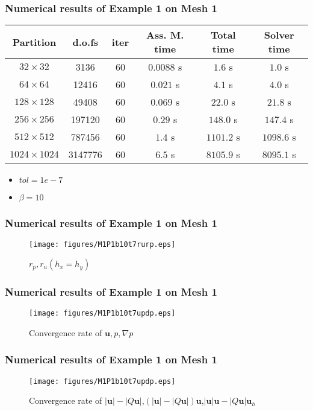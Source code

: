 \documentclass[notheorems,serif]{beamer}
\begin{document}
\begin{frame}
\frametitle{Numerical results of Example 1 on Mesh 1}
\begin{tabular}{ |c|c|c|c|c|c| }   
\hline   
Partition & d.o.fs & iter & Ass. M. time & Total time & Solver time \\
\hline
$32\times 32$ & 3136 & 60 & $0.0088$ s & $1.6$ s & $1.0$ s \\
$64\times 64$ & 12416 & 60 & $0.021$ s & $4.1$ s & $4.0$ s \\
$128\times 128$ & 49408 & 60 & $0.069$ s & $22.0$ s & $21.8$ s \\
$256\times 256$ & 197120 & 60 & $0.29$ s & $148.0$ s & $147.4$ s \\
$512\times 512$ & 787456 & 60 & $1.4$ s & $1101.2$ s & $1098.6$ s \\
$1024\times 1024$ & 3147776 & 60 & $6.5$ s& $8105.9$ s & $8095.1$ s \\
\hline 
\end{tabular}
\smallskip
\begin{itemize}
\item $tol = 1e-7$
\item $\beta = 10$
\end{itemize}
\end{frame}
\begin{frame}
\frametitle{Numerical results of Example 1 on Mesh 1}
\begin{figure}[H] 
\centering 
\texttt{[image: figures/M1P1b10t7rurp.eps]} 
\caption{$r_p, r_u(h_x = h_y)$} 
\label{fig:rurpmesh1p1} 
\end{figure}
\end{frame}

\begin{frame}
\frametitle{Numerical results of Example 1 on Mesh 1}
\begin{figure}[H] 
\centering 
\texttt{[image: figures/M1P1b10t7updp.eps]} 
\caption{Convergence rate of $\boldsymbol{u}, p, \nabla p$} 
\label{fig:upmesh1p1} 
\end{figure}
\end{frame}

\begin{frame}
\frametitle{Numerical results of Example 1 on Mesh 1}
\begin{figure}[H] 
\centering 
\texttt{[image: figures/M1P1b10t7updp.eps]} 
\caption{Convergence rate of $\left|\boldsymbol{u}\right|-\left|Q\boldsymbol{u}\right|$,$(\left|\boldsymbol{u}\right|-\left|Q\boldsymbol{u}\right|)\boldsymbol{u}$,$\left|\boldsymbol{u}\right|\boldsymbol{u}-\left|Q\boldsymbol{u}\right|\boldsymbol{u}_h$} 
\label{fig:normumesh1p1} 
\end{figure}
\end{frame}
\end{document}
